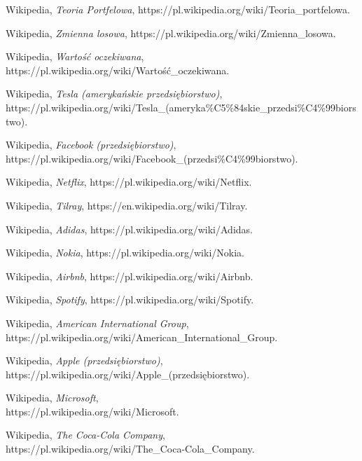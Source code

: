 \documentclass[magister]{dyplom}
\begin{document}
\begin{thebibliography}{30}
	Wikipedia,
	\emph{Teoria Portfelowa},
	https://pl.wikipedia.org/wiki/Teoria\_portfelowa.
	
	Wikipedia,
	\emph{Zmienna losowa},
	https://pl.wikipedia.org/wiki/Zmienna\_losowa.
	
	Wikipedia,
	\emph{Wartość oczekiwana},
	https://pl.wikipedia.org/wiki/Wartość\_oczekiwana.

	Wikipedia,
	\emph{Tesla (amerykańskie przedsiębiorstwo)},\\
	https://pl.wikipedia.org/wiki/Tesla\_(ameryka\%C5\%84skie\_przedsi\%C4\%99biorstwo).
	
	Wikipedia,
	\emph{Facebook (przedsiębiorstwo)},\\
	https://pl.wikipedia.org/wiki/Facebook\_(przedsi\%C4\%99biorstwo).
	
	Wikipedia,
	\emph{Netflix},
	https://pl.wikipedia.org/wiki/Netflix.
	
	Wikipedia,
	\emph{Tilray},
	https://en.wikipedia.org/wiki/Tilray.
	
	Wikipedia,
	\emph{Adidas},
	https://pl.wikipedia.org/wiki/Adidas.
	
	Wikipedia,
	\emph{Nokia},
	https://pl.wikipedia.org/wiki/Nokia.
	
	Wikipedia,
	\emph{Airbnb},	
	https://pl.wikipedia.org/wiki/Airbnb.
	
	Wikipedia,
	\emph{Spotify},
	https://pl.wikipedia.org/wiki/Spotify.
	
	Wikipedia,
	\emph{American International Group},\\
	https://pl.wikipedia.org/wiki/American\_International\_Group.
	
	Wikipedia,
	\emph{Apple (przedsiębiorstwo)},\\
	https://pl.wikipedia.org/wiki/Apple\_(przedsiębiorstwo).
	
	Wikipedia,
	\emph{Microsoft},\\
	https://pl.wikipedia.org/wiki/Microsoft.
	
	Wikipedia,
	\emph{The Coca-Cola Company},\\
	https://pl.wikipedia.org/wiki/The\_Coca-Cola\_Company.
\end{thebibliography}
\end{document}

